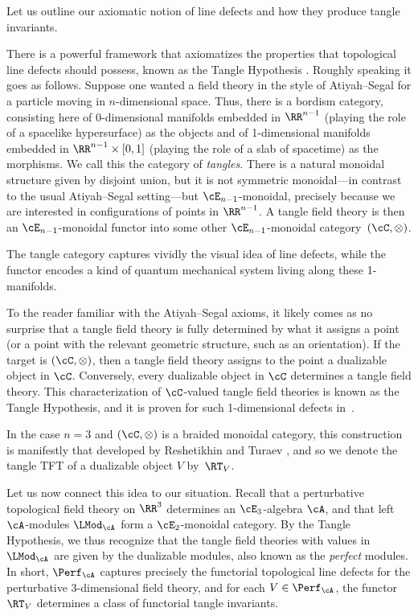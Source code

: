 \documentclass[10pt]{amsart}
\begin{document}
Let us outline our axiomatic notion of line defects and how they produce tangle invariants.

There is a powerful framework that axiomatizes the properties that topological line defects should possess,
known as the Tangle Hypothesis \cite{BaeDol, LurTFT}.
Roughly speaking it goes as follows. 
Suppose one wanted a field theory in the style of Atiyah--Segal for a particle moving in $n$-dimensional space. 
Thus, there is a bordism category, consisting here of 0-dimensional manifolds embedded in $\RR^{n-1}$ (playing the role of a spacelike hypersurface) as the objects and of 1-dimensional manifolds embedded in $\RR^{n-1} \times [0,1]$ (playing the role of a slab of spacetime) as the morphisms.
We call this the category of {\em tangles}.
There is a natural monoidal structure given by disjoint union,
but it is not symmetric monoidal---in contrast to the usual Atiyah--Segal setting---but $\cE_{n-1}$-monoidal,
precisely because we are interested in configurations of points in $\RR^{n-1}$.
A tangle field theory is then an $\cE_{n-1}$-monoidal functor into some other $\cE_{n-1}$-monoidal category~$(\cC,\otimes)$.

The tangle category captures vividly the visual idea of line defects,
while the functor encodes a kind of quantum mechanical system living along these 1-manifolds.

To the reader familiar with the Atiyah--Segal axioms, 
it likely comes as no surprise that a tangle field theory is fully determined by what it assigns a point (or a point with the relevant geometric structure, such as an orientation).
If the target is $(\cC,\otimes)$, then a tangle field theory assigns to the point a dualizable object in $\cC$.
Conversely, every dualizable object in $\cC$ determines a tangle field theory.
This characterization of $\cC$-valued tangle field theories is known as the Tangle Hypothesis,
and it is proven for such 1-dimensional defects in~\cite{AF.tangle}.

In the case $n = 3$ and $(\cC,\otimes)$ is a braided monoidal category,
this construction is manifestly that developed by Reshetikhin and Turaev \cite{RT},
and so we denote the tangle TFT of a dualizable object $V$ by~$\RT_V$.

Let us now connect this idea to our situation.
Recall that a perturbative topological field theory on $\RR^3$ determines an $\cE_3$-algebra $\cA$,
and that left $\cA$-modules $\LMod_\cA$ form a $\cE_{2}$-monoidal category.
By the Tangle Hypothesis, we thus recognize that the tangle field theories with values in $\LMod_\cA$ are given by the dualizable modules, also known as the {\em perfect} modules. 
In short, $\Perf_{\cA}$ captures precisely the functorial topological line defects for the perturbative 3-dimensional field theory,
and for each $V \in \Perf_{\cA}$, the functor $\RT_V$ determines a class of functorial tangle invariants.
\end{document}
